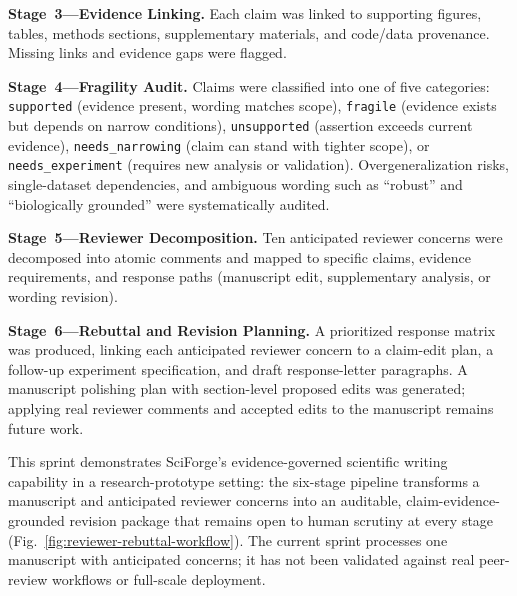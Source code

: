 \documentclass[sn-basic,Numbered,pdflatex]{sn-jnl}
\begin{document}
\textbf{Stage~3---Evidence Linking.} Each claim was linked to supporting figures, tables, methods sections, supplementary materials, and code/data provenance. Missing links and evidence gaps were flagged.

\textbf{Stage~4---Fragility Audit.} Claims were classified into one of five categories: \texttt{supported} (evidence present, wording matches scope), \texttt{fragile} (evidence exists but depends on narrow conditions), \texttt{unsupported} (assertion exceeds current evidence), \texttt{needs\_narrowing} (claim can stand with tighter scope), or \texttt{needs\_experiment} (requires new analysis or validation). Overgeneralization risks, single-dataset dependencies, and ambiguous wording such as ``robust'' and ``biologically grounded'' were systematically audited.

\textbf{Stage~5---Reviewer Decomposition.} Ten anticipated reviewer concerns were decomposed into atomic comments and mapped to specific claims, evidence requirements, and response paths (manuscript edit, supplementary analysis, or wording revision).

\textbf{Stage~6---Rebuttal and Revision Planning.} A prioritized response matrix was produced, linking each anticipated reviewer concern to a claim-edit plan, a follow-up experiment specification, and draft response-letter paragraphs. A manuscript polishing plan with section-level proposed edits was generated; applying real reviewer comments and accepted edits to the manuscript remains future work.

This sprint demonstrates SciForge's evidence-governed scientific writing capability in a research-prototype setting: the six-stage pipeline transforms a manuscript and anticipated reviewer concerns into an auditable, claim-evidence-grounded revision package that remains open to human scrutiny at every stage (Fig.~\ref{fig:reviewer-rebuttal-workflow}). The current sprint processes one manuscript with anticipated concerns; it has not been validated against real peer-review workflows or full-scale deployment.
\end{document}
